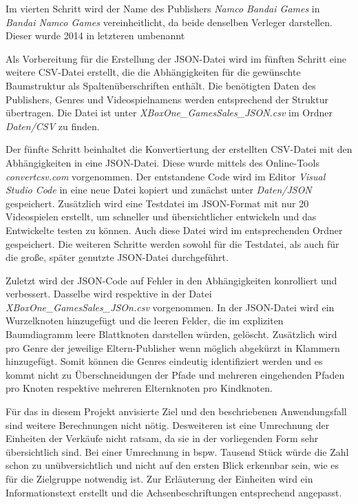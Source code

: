 \documentclass[usegeometry=true]{scrartcl}
\begin{document}
Im vierten Schritt wird der Name des Publishers \textit{Namco Bandai Games} in \textit{Bandai Namco Games} vereinheitlicht, da beide denselben Verleger darstellen. 
Dieser wurde 2014 in letzteren umbenannt

Als Vorbereitung für die Erstellung der JSON-Datei wird im fünften Schritt eine weitere CSV-Datei erstellt, die die Abhängigkeiten für die gewünschte Baumstruktur als Spaltenüberschriften enthält. 
Die benötigten Daten des Publishers, Genres und Videospielnamens werden entsprechend der Struktur übertragen. 
Die Datei ist unter \textit{XBoxOne_GamesSales_JSON.csv} im Ordner \textit{Daten/CSV} zu finden.

Der fünfte Schritt beinhaltet die Konvertiertung der erstellten CSV-Datei mit den Abhängigkeiten in eine JSON-Datei. 
Diese wurde mittels des Online-Tools \textit{convertcsv.com} vorgenommen. %
Der entstandene Code wird im Editor \textit{Visual Studio Code} in eine neue Datei kopiert und zunächst unter \textit{Daten/JSON} gespeichert. 
Zusätzlich wird eine Testdatei im JSON-Format mit nur 20 Videospielen erstellt, um schneller und übersichtlicher 
entwickeln und das Entwickelte testen zu können. Auch diese Datei wird im entsprechenden Ordner gespeichert. 
Die weiteren Schritte werden sowohl für die Testdatei, als auch für die große, später genutzte JSON-Datei durchgeführt.

Zuletzt wird der JSON-Code auf Fehler in den Abhängigkeiten konrolliert und verbessert.
 Dasselbe wird respektive in der Datei \textit{XBoxOne_GamesSales_JSOn.csv} vorgenommen. 
In der JSON-Datei wird ein Wurzelknoten hinzugefügt und die leeren Felder, die im expliziten Baumdiagramm leere Blattknoten darstellen würden, gelöscht. 
Zusätzlich wird pro Genre der jeweilige Eltern-Publisher wenn möglich abgekürzt
in Klammern hinzugefügt. Somit können die Genres eindeutig identifiziert werden und es kommt nicht zu Überschneidungen der Pfade und mehreren eingehenden Pfaden pro Knoten respektive mehreren Elternknoten pro Kindknoten. 

Für das in diesem Projekt anvisierte Ziel und den beschriebenen Anwendungsfall sind weitere Berechnungen nicht nötig. %
Desweiteren ist eine Umrechnung der Einheiten der Verkäufe nicht ratsam, da sie in der vorliegenden Form sehr übersichtlich sind. 
Bei einer Umrechnung in bspw. Tausend Stück würde die Zahl schon zu unübversichtlich und nicht auf den ersten Blick erkennbar sein, wie es für die Zielgruppe notwendig ist. Zur Erläuterung der Einheiten wird ein Informationstext erstellt und die Achsenbeschriftungen entsprechend angepasst.
\end{document}
